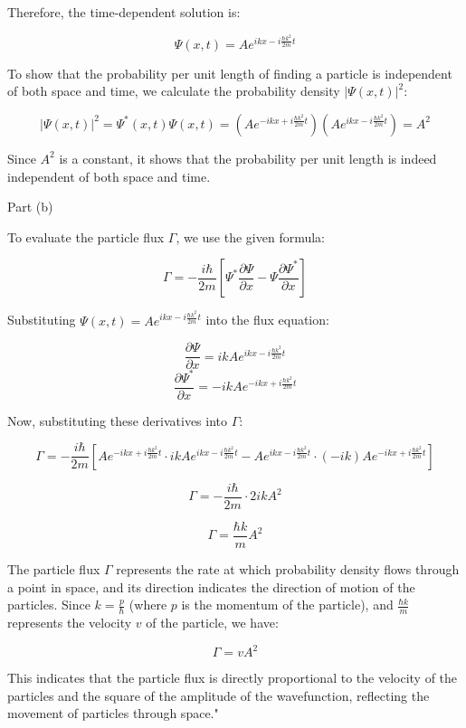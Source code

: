 Therefore, the time-dependent solution is:

\[ \Psi(x,t) = Ae^{ikx - i\frac{\hbar k^2}{2m}t} \]

To show that the probability per unit length of finding a particle is independent of both space and time, we calculate the probability density \( |\Psi(x,t)|^2 \):

\[ |\Psi(x,t)|^2 = \Psi^{*}(x,t) \Psi(x,t) = \left(Ae^{-ikx + i\frac{\hbar k^2}{2m}t}\right) \left(Ae^{ikx - i\frac{\hbar k^2}{2m}t}\right) = A^2 \]

Since \( A^2 \) is a constant, it shows that the probability per unit length is indeed independent of both space and time.

Part (b)

To evaluate the particle flux \( \Gamma \), we use the given formula:

\[ \Gamma = -\frac{i\hbar}{2m}\left[ \Psi^{*}\frac{\partial\Psi}{\partial x} - \Psi\frac{\partial\Psi^{*}}{\partial x} \right] \]

Substituting \( \Psi(x,t) = Ae^{ikx - i\frac{\hbar k^2}{2m}t} \) into the flux equation:

\[ \frac{\partial\Psi}{\partial x} = ikAe^{ikx - i\frac{\hbar k^2}{2m}t} \]
\[ \frac{\partial\Psi^{*}}{\partial x} = -ikAe^{-ikx + i\frac{\hbar k^2}{2m}t} \]

Now, substituting these derivatives into \( \Gamma \):

\[ \Gamma = -\frac{i\hbar}{2m}\left[ Ae^{-ikx + i\frac{\hbar k^2}{2m}t} \cdot ikAe^{ikx - i\frac{\hbar k^2}{2m}t} - Ae^{ikx - i\frac{\hbar k^2}{2m}t} \cdot (-ik)Ae^{-ikx + i\frac{\hbar k^2}{2m}t} \right] \]

\[ \Gamma = -\frac{i\hbar}{2m} \cdot 2ikA^2 \]

\[ \Gamma = \frac{\hbar k}{m}A^2 \]

The particle flux \( \Gamma \) represents the rate at which probability density flows through a point in space, and its direction indicates the direction of motion of the particles. Since \( k = \frac{p}{\hbar} \) (where \( p \) is the momentum of the particle), and \( \frac{\hbar k}{m} \) represents the velocity \( v \) of the particle, we have:

\[ \Gamma = vA^2 \]

This indicates that the particle flux is directly proportional to the velocity of the particles and the square of the amplitude of the wavefunction, reflecting the movement of particles through space."

